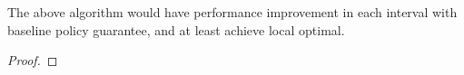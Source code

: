 \begin{lemma}
    The above algorithm would have performance improvement in each interval with baseline policy guarantee, and at least achieve local optimal.
\end{lemma}
\begin{proof}
    
\end{proof}
